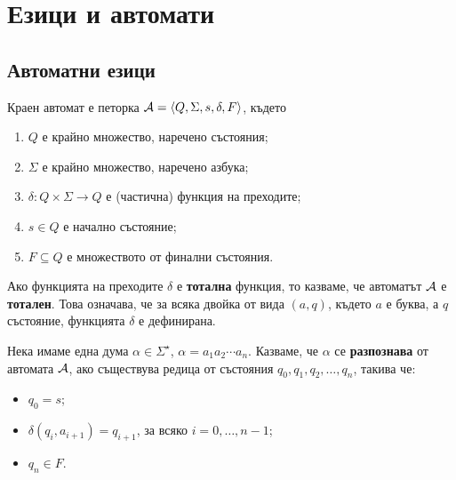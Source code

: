 \chapter{Езици и автомати}

\section{Автоматни езици}

\begin{dfn}
  Краен автомат е петорка $\mathcal{A} = \langle{Q,\Sigma,s,\delta,F}\rangle$, където
  \begin{enumerate}[1)]
  \item
    $Q$ е крайно множество, наречено състояния;
  \item
    $\Sigma$ е крайно множество, наречено азбука;
  \item
    $\delta:Q\times\Sigma\to Q$ е (частична) функция на преходите;
  \item
    $s\in Q$ е начално състояние;
  \item
    $F\subseteq Q$ е множеството от финални състояния.
  \end{enumerate}
\end{dfn}

Ако функцията на преходите $\delta$ е {\bf тотална} функция, то казваме, 
че автоматът $\mathcal{A}$ е {\bf тотален}. Това означава, че за всяка двойка от вида $(a,q)$,
където $a$ е буква, а $q$ състояние, функцията $\delta$ е дефинирана.

Нека имаме една дума $\alpha \in \Sigma^\star$, $\alpha = a_1a_2\cdots a_n$.
Казваме, че $\alpha$ се {\bf разпознава} от автомата $\mathcal{A}$, ако
съществува редица от състояния $q_0,q_1,q_2,\dots,q_n$, такива че:
\begin{itemize}
\item
  $q_0 = s$;
\item
  $\delta(q_i,a_{i+1}) = q_{i+1}$, за всяко $i = 0, \dots, n-1$;
\item
  $q_n \in F$.
\end{itemize}


